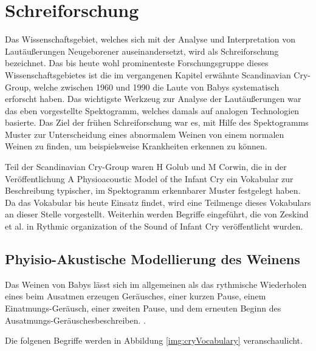 \section{Schreiforschung}
\label{sec:cryresearch_foundations}

Das Wissenschaftsgebiet, welches sich mit der Analyse und Interpretation von Lautäußerungen Neugeborener auseinandersetzt, wird als \glqq Schreiforschung\grqq{} bezeichnet. Das bis heute wohl prominenteste Forschungsgruppe dieses Wissenschaftsgebietes ist die im vergangenen Kapitel erwähnte \glqq Scandinavian Cry-Group\grqq \cite{crygroup}, welche zwischen 1960 und 1990 die Laute von Babys systematisch erforscht haben. Das wichtigste Werkzeug zur Analyse der Lautäußerungen war das eben vorgestellte Spektogramm, welches damals auf analogen Technologien basierte. Das Ziel der frühen Schreiforschung war es, mit Hilfe des Spektogramms Muster zur Unterscheidung eines abnormalem Weinen von einem normalen Weinen zu finden, um beispielsweise Krankheiten erkennen zu können.\cite[S. 142]{signal} 

Teil der Scandinavian Cry-Group waren H Golub und M Corwin, die in der Veröffentlichung \glqq A Physioacoustic Model of the Infant Cry\grqq \cite{cryModel} ein Vokabular zur Beschreibung typischer, im Spektogramm erkennbarer Muster festgelegt haben. Da das Vokabular bis heute Einsatz findet, wird eine Teilmenge dieses Vokabulars an dieser Stelle vorgestellt. Weiterhin werden Begriffe eingeführt, die von Zeskind et al. in \glqq Rythmic organization of the Sound of Infant Cry \grqq{} veröffentlicht wurden.\cite{rythmic}

\subsection{Phyisio-Akustische Modellierung des Weinens}
\label{sec:acousticModel}

Das Weinen von Babys lässt sich im allgemeinen als das \glqq rythmische Wiederholen eines beim Ausatmen erzeugen Geräusches, einer kurzen Pause, einem Einatmungs-Geräusch, einer zweiten Pause, und dem erneuten Beginn des Ausatmungs-Geräusches\grqq beschreiben. \cite{wolff}.

Die folgenen Begriffe werden in Abbildung \ref{img:cryVocabulary} veranschaulicht.


